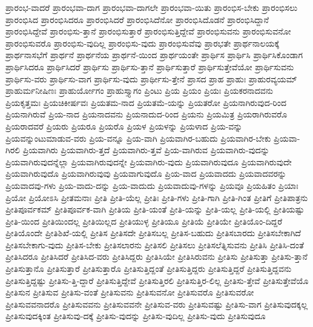 {ಪ್ರಾರಂಭ-ವಾದರೆ
ಪ್ರಾರಂಭವಾ-ದಾಗ
ಪ್ರಾರಂಭವಾ-ದಾಗಲೇ
ಪ್ರಾರಂಭವಾ-ಯಿತು
ಪ್ರಾರಂಭಿಸ-ಬೇಕು
ಪ್ರಾರಂಭಿಸಲು
ಪ್ರಾರಂಭಿಸಿದ
ಪ್ರಾರಂಭಿಸಿದರೂ
ಪ್ರಾರಂಭಿಸಿದರೆ
ಪ್ರಾರಂಭಿಸಿದೆನೋ
ಪ್ರಾರಂಭಿಸಿದೊಡನೆ
ಪ್ರಾರಂಭಿಸಿದ್ದಾನೆ
ಪ್ರಾರಂಭಿಸಿದ್ದೇವೆ
ಪ್ರಾರಂಭಿಸು-ತ್ತಾನೆ
ಪ್ರಾರಂಭಿಸುತ್ತಾರೆ
ಪ್ರಾರಂಭಿಸುತ್ತಿದ್ದೇವೆ
ಪ್ರಾರಂಭಿಸುವನು
ಪ್ರಾರಂಭಿಸುವನೋ
ಪ್ರಾರಂಭಿಸುವರೊ
ಪ್ರಾರಂಭಿಸು-ವುದಿಲ್ಲ
ಪ್ರಾರಂಭಿಸು-ವುದು
ಪ್ರಾರಂಭಿಸುವೆವು
ಪ್ರಾರಭತೇ
ಪ್ರಾರ್ಥನಾಲಯಕ್ಕೆ
ಪ್ರಾರ್ಥನಾಸಭೆಗೆ
ಪ್ರಾರ್ಥನೆ
ಪ್ರಾರ್ಥನೆಯ
ಪ್ರಾರ್ಥನೆ-ಯಿಂದ
ಪ್ರಾರ್ಥಯಂತೇ
ಪ್ರಾರ್ಥಿಸ
ಪ್ರಾರ್ಥಿಸಿ
ಪ್ರಾರ್ಥಿಸಿಕೊಂಡಾಗ
ಪ್ರಾರ್ಥಿಸಿದರೂ
ಪ್ರಾರ್ಥಿಸಿದರೆ
ಪ್ರಾರ್ಥಿಸು
ಪ್ರಾರ್ಥಿಸು-ತ್ತಾನೆ
ಪ್ರಾರ್ಥಿಸುತ್ತಾರೆ
ಪ್ರಾರ್ಥಿಸುತ್ತೇವೆಯೋ
ಪ್ರಾರ್ಥಿಸುವನು
ಪ್ರಾರ್ಥಿಸು-ವರು
ಪ್ರಾರ್ಥಿಸು-ವಾಗ
ಪ್ರಾರ್ಥಿಸು-ವುದು
ಪ್ರಾರ್ಥೀಸು-ತ್ತೇನೆ
ಪ್ರಾಸದ
ಪ್ರಾಹ
ಪ್ರಾಹುಃ
ಪ್ರಾಹುರವ್ಯಯಮ್
ಪ್ರಾಹುರ್ಮನೀಷಿಣಃ
ಪ್ರಾಹುರ್ಯೋಗಂ
ಪ್ರಾಹುಸ್ತ್ಯಾಗಂ
ಪ್ರಿಂಟು
ಪ್ರಿಯ
ಪ್ರಿಯಂ
ಪ್ರಿಯಃ
ಪ್ರಿಯಕರನಾದವನು
ಪ್ರಿಯಕೃತ್ತಮಃ
ಪ್ರಿಯಚಿಕೀರ್ಷವಃ
ಪ್ರಿಯತಮ-ನಾದ
ಪ್ರಿಯತಮೆ-ಯನ್ನು
ಪ್ರಿಯತರೋ
ಪ್ರಿಯನಾಗಿರುವುದ-ರಿಂದ
ಪ್ರಿಯನಾಗಿರುವೆ
ಪ್ರಿಯ-ನಾದ
ಪ್ರಿಯನಾದವನು
ಪ್ರಿಯನಾದುದ-ರಿಂದ
ಪ್ರಿಯನು
ಪ್ರಿಯಮಿತ್ರ
ಪ್ರಿಯರಾಗಿರುವರೊ
ಪ್ರಿಯರಾದವರೆ
ಪ್ರಿಯರು
ಪ್ರಿಯರೂ
ಪ್ರಿಯರೊ
ಪ್ರಿಯಳ
ಪ್ರಿಯಳನ್ನು
ಪ್ರಿಯಳಾದ
ಪ್ರಿಯ-ವನ್ನು
ಪ್ರಿಯವನ್ನುಂಟುಮಾಡುವ-ವರು
ಪ್ರಿಯ-ವನ್ನೂ
ಪ್ರಿಯ-ವಾಗಿ
ಪ್ರಿಯವಾಗಿರ-ಬಹುದು
ಪ್ರಿಯವಾಗಿರ-ಬೇಕು
ಪ್ರಿಯವಾ-ಗಿರಲಿ
ಪ್ರಿಯವಾಗಿರು
ಪ್ರಿಯವಾಗಿರು-ತ್ತದೆ
ಪ್ರಿಯವಾಗಿರು-ತ್ತವೆ
ಪ್ರಿಯ-ವಾಗಿರುವ
ಪ್ರಿಯವಾಗಿರು-ವುದನ್ನು
ಪ್ರಿಯವಾಗಿರುವುದನ್ನೆಲ್ಲಾ
ಪ್ರಿಯವಾಗಿರುವುದನ್ನೇ
ಪ್ರಿಯವಾಗಿರು-ವುದು
ಪ್ರಿಯವಾಗಿರುವುದೂ
ಪ್ರಿಯವಾಗಿರುವುದೇ
ಪ್ರಿಯವಾಗಿರುವುದೊ
ಪ್ರಿಯವಾಗಿರುವುವು
ಪ್ರಿಯವಾಗುವುದೊ
ಪ್ರಿಯ-ವಾದ
ಪ್ರಿಯವಾದದು
ಪ್ರಿಯವಾದವರನ್ನು
ಪ್ರಿಯವಾದವು-ಗಳು
ಪ್ರಿಯ-ವಾದು-ದನ್ನು
ಪ್ರಿಯ-ವಾದುದು
ಪ್ರಿಯವಾದುವು-ಗಳನ್ನು
ಪ್ರಿಯವೂ
ಪ್ರಿಯಹಿತಂ
ಪ್ರಿಯಾಃ
ಪ್ರಿಯೋ
ಪ್ರಿಯೋಽಸಿ
ಪ್ರೀತಮನಾಃ
ಪ್ರೀತಿ
ಪ್ರೀತಿ-ಯೆಲ್ಲ
ಪ್ರೀತಿಃ
ಪ್ರೀತಿ-ಗಳು
ಪ್ರೀತಿ-ಗಾಗಿ
ಪ್ರೀತಿ-ಗಿಂತ
ಪ್ರೀತಿಗೆ
ಪ್ರೀತಿಪಾತ್ರನು
ಪ್ರೀತಿಪೂರ್ವಕಮ್
ಪ್ರೀತಿಪೂರ್ವಕ-ವಾಗಿ
ಪ್ರೀತಿಯ
ಪ್ರೀತಿ-ಯಂತೆ
ಪ್ರೀತಿ-ಯನ್ನು
ಪ್ರೀತಿ-ಯಲ್ಲ
ಪ್ರೀತಿ-ಯಲ್ಲಿ
ಪ್ರೀತಿಯಷ್ಟು
ಪ್ರೀತಿ-ಯಿಂದ
ಪ್ರೀತಿಯಿಂದಲ್ಲ
ಪ್ರೀತಿಯಿಲ್ಲದ
ಪ್ರೀತಿಯುಳ್ಳ
ಪ್ರೀತಿಯೂ
ಪ್ರೀತಿಯೆ
ಪ್ರೀತಿಯೇ
ಪ್ರೀತಿಯೊಂ-ದಿದ್ದರೆ
ಪ್ರೀತಿಯೊಂದೇ
ಪ್ರೀತಿಶಿಖೆ-ಯಲ್ಲಿ
ಪ್ರೀತಿಸ
ಪ್ರೀತಿಸದೇ
ಪ್ರೀತಿಸಬಲ್ಲ
ಪ್ರೀತಿಸ-ಬಹುದು
ಪ್ರೀತಿಸಬಾರದು
ಪ್ರೀತಿಸಬೇಕಾಗಿದೆ
ಪ್ರೀತಿಸಬೇಕಾಗು-ವುದು
ಪ್ರೀತಿಸ-ಬೇಕು
ಪ್ರೀತಿಸಲಾರನು
ಪ್ರೀತಿಸಲಿ
ಪ್ರೀತಿಸಲು
ಪ್ರೀತಿಸಲೆತ್ನಿಸುವನು
ಪ್ರೀತಿಸಿ
ಪ್ರೀತಿಸಿ-ದಂತೆ
ಪ್ರೀತಿಸಿದರೂ
ಪ್ರೀತಿಸಿದರೆ
ಪ್ರೀತಿಸಿದ-ವರು
ಪ್ರೀತಿಸಿದ್ದರು
ಪ್ರೀತಿಸಿಯೇ
ಪ್ರೀತಿಸಿರುವನು
ಪ್ರೀತಿಸು
ಪ್ರೀತಿಸುತ್ತಾ
ಪ್ರೀತಿಸು-ತ್ತಾನೆ
ಪ್ರೀತಿಸುತ್ತಾನೊ
ಪ್ರೀತಿಸುತ್ತಾರೆ
ಪ್ರೀತಿಸುತ್ತಾರೊ
ಪ್ರೀತಿಸುತ್ತಿದ್ದಂತೆ
ಪ್ರೀತಿಸುತ್ತಿದ್ದರು
ಪ್ರೀತಿಸುತ್ತಿದ್ದರೆ
ಪ್ರೀತಿಸುತ್ತಿದ್ದವನು
ಪ್ರೀತಿಸುತ್ತಿದ್ದಷ್ಟು
ಪ್ರೀತಿಸು-ತ್ತಿ-ದ್ದಾರೆ
ಪ್ರೀತಿಸುತ್ತಿದ್ದೇವೆ
ಪ್ರೀತಿಸುತ್ತಿರಲಿ
ಪ್ರೀತಿಸುತ್ತಿರ-ಲಿಲ್ಲ
ಪ್ರೀತಿಸು-ತ್ತೇವೆ
ಪ್ರೀತಿಸುತ್ತೇವೆಯೊ
ಪ್ರೀತಿಸುನ
ಪ್ರೀತಿಸುವ
ಪ್ರೀತಿಸು-ವಂತೆ
ಪ್ರೀತಿಸುವನು
ಪ್ರೀತಿಸುವನೋ
ಪ್ರೀತಿಸುವರೊ
ಪ್ರೀತಿಸುವರೋ
ಪ್ರೀತಿಸುವವನಾದರೊ
ಪ್ರೀತಿಸುವವನು
ಪ್ರೀತಿಸುವವನೇ
ಪ್ರೀತಿಸುವ-ವರು
ಪ್ರೀತಿಸುವಷ್ಟು
ಪ್ರೀತಿಸು-ವಾಗ
ಪ್ರೀತಿಸುವುದಕ್ಕಲ್ಲ
ಪ್ರೀತಿಸುವುದಕ್ಕಿಂತ
ಪ್ರೀತಿಸುವು-ದಕ್ಕೆ
ಪ್ರೀತಿಸು-ವುದನ್ನು
ಪ್ರೀತಿಸು-ವುದಿಲ್ಲ
ಪ್ರೀತಿಸು-ವುದು
ಪ್ರೀತಿಸುವುದೂ
}
